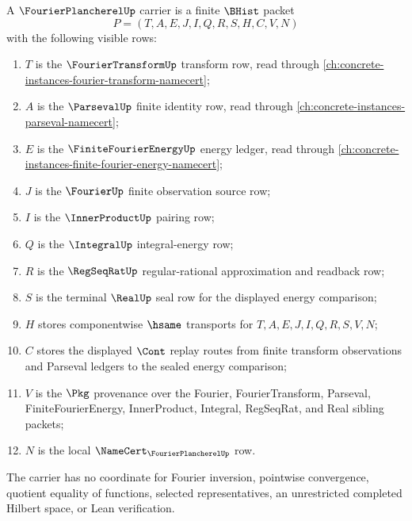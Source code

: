 \begin{definition}
\label{def:fourier-plancherel-carrier}
A $\FourierPlancherelUp$ carrier is a finite $\BHist$ packet
$$
P=(T,A,E,J,I,Q,R,S,H,C,V,N)
$$
with the following visible rows:
\begin{enumerate}
\item $T$ is the $\FourierTransformUp$ transform row, read through \autoref{ch:concrete-instances-fourier-transform-namecert};
\item $A$ is the $\ParsevalUp$ finite identity row, read through \autoref{ch:concrete-instances-parseval-namecert};
\item $E$ is the $\FiniteFourierEnergyUp$ energy ledger, read through \autoref{ch:concrete-instances-finite-fourier-energy-namecert};
\item $J$ is the $\FourierUp$ finite observation source row;
\item $I$ is the $\InnerProductUp$ pairing row;
\item $Q$ is the $\IntegralUp$ integral-energy row;
\item $R$ is the $\RegSeqRatUp$ regular-rational approximation and readback row;
\item $S$ is the terminal $\RealUp$ seal row for the displayed energy comparison;
\item $H$ stores componentwise $\hsame$ transports for $T,A,E,J,I,Q,R,S,V,N$;
\item $C$ stores the displayed $\Cont$ replay routes from finite transform observations and Parseval ledgers to the sealed energy comparison;
\item $V$ is the $\Pkg$ provenance over the Fourier, FourierTransform, Parseval, FiniteFourierEnergy, InnerProduct, Integral, RegSeqRat, and Real sibling packets;
\item $N$ is the local $\NameCert_{\FourierPlancherelUp}$ row.
\end{enumerate}
The carrier has no coordinate for Fourier inversion, pointwise convergence, quotient equality of functions, selected representatives, an unrestricted completed Hilbert space, or Lean verification.
\end{definition}

